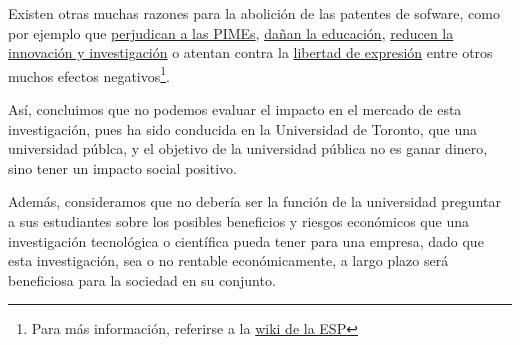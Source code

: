 \documentclass[12pt]{report}
\begin{document}
Existen otras muchas razones para la abolición de las patentes de sofware, como
por ejemplo que
\href{http://en.swpat.org/wiki/Software_patents_harm_SMEs}{perjudican a las
PIMEs}, \href{http://en.swpat.org/wiki/Harms_to_education}{dañan la educación},
\href{http://en.swpat.org/wiki/Reducing_innovation_and_research}{reducen la
innovación y investigación} o atentan contra la
\href{http://en.swpat.org/wiki/Freedom_of_expression}{libertad de expresión}
entre otros muchos efectos negativos\footnote{Para más información, referirse a
la \href{http://en.swpat.org/wiki/Why_abolish_software_patents}{wiki de la ESP}}.

Así, concluimos que no podemos evaluar el impacto en el mercado de esta investigación, pues ha sido conducida en la Universidad de Toronto, que una universidad públca, y el objetivo de la universidad pública no es ganar dinero, sino tener un impacto social positivo.

Además, consideramos que no debería ser la función de la universidad preguntar a sus estudiantes sobre los posibles beneficios y riesgos económicos que una investigación tecnológica o científica pueda tener para una empresa, dado que esta investigación, sea o no rentable económicamente, a largo plazo será beneficiosa para la sociedad en su conjunto.

\nocite{*}
\printbibliography[title={Bibliografía},heading=bibintoc]
\end{document}
